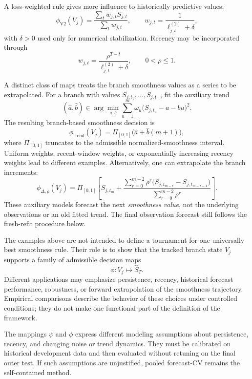 A loss-weighted rule gives more influence to historically predictive values:
\begin{equation}
\label{eq:rule_validation2}
\phi_{\mathrm{V2}}(V_j)
=
\frac{
\sum_t w_{j,t}S_{j,t}
}{
\sum_t w_{j,t}
},
\qquad
w_{j,t}
=
\frac{1}{\ell^{(2)}_{j,t}+\delta},
\end{equation}
with $\delta>0$ used only for numerical stabilization. Recency may be incorporated through
\begin{equation}
\label{eq:recency_validation2_weights}
w_{j,t}
=
\frac{\rho^{T-t}}{\ell^{(2)}_{j,t}+\delta},
\qquad
0<\rho\le1.
\end{equation}

A distinct class of maps treats the branch smoothness values as a series to be extrapolated. For a branch with values $S_{j,t_1},\ldots,S_{j,t_m}$, fit the auxiliary trend
\begin{equation}
\label{eq:branch_linear_fit}
(\widehat a,\widehat b)
\in
\arg\min_{a,b}
\sum_{u=1}^{m}
\omega_u\bigl(S_{j,t_u}-a-bu\bigr)^2.
\end{equation}
The resulting branch-based smoothness decision is
\begin{equation}
\label{eq:rule_linear_trend}
\phi_{\mathrm{trend}}(V_j)
=
\Pi_{[0,1]}\bigl(\widehat a+\widehat b(m+1)\bigr),
\end{equation}
where $\Pi_{[0,1]}$ truncates to the admissible normalized-smoothness interval. Uniform weights, recent-window weights, or exponentially increasing recency weights lead to different examples. Alternatively, one can extrapolate the branch increments:
\begin{equation}
\label{eq:rule_increment_extrapolation}
\phi_{\Delta,\rho}(V_j)
=
\Pi_{[0,1]}
\left[
S_{j,t_m}
+
\frac{
\sum_{r=0}^{m-2}
\rho^r\bigl(S_{j,t_{m-r}}-S_{j,t_{m-r-1}}\bigr)
}{
\sum_{r=0}^{m-2}\rho^r
}
\right].
\end{equation}
These auxiliary models forecast the next \emph{smoothness value}, not the underlying observations or an old fitted trend. The final observation forecast still follows the fresh-refit procedure below.

The examples above are not intended to define a tournament for one universally best smoothness rule. Their role is to show that the tracked branch state $V_j$ supports a family of admissible decision maps
\begin{equation}
\label{eq:branch_decision_map}
\phi:V_j\mapsto \widehat S_T.
\end{equation}
Different applications may emphasize persistence, recency, historical forecast performance, robustness, or forward extrapolation of the smoothness trajectory. Empirical comparisons describe the behavior of these choices under controlled conditions; they do not make one functional part of the definition of the framework.


The mappings $\psi$ and $\phi$ express different modeling assumptions
about persistence, recency, and changing noise or trend dynamics.
They must be calibrated on historical development data and then
evaluated without retuning on the final outer test. If such
assumptions are unjustified, pooled forecast-CV remains the
self-contained method.
